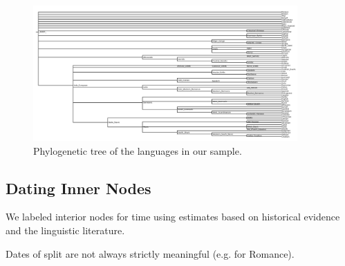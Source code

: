 \documentclass[11pt,a4paper]{article}
\begin{document}
\begin{figure}
    \centering
	\includegraphics[width=0.9\textwidth]{../trees/tree.png}
       \caption{Phylogenetic tree of the languages in our sample.}
    \label{fig:tree}
\end{figure}




\subsection{Dating Inner Nodes}
We labeled interior nodes for time using estimates based on historical evidence and the linguistic literature.


Dates of split are not always strictly meaningful (e.g. for Romance).
\end{document}
